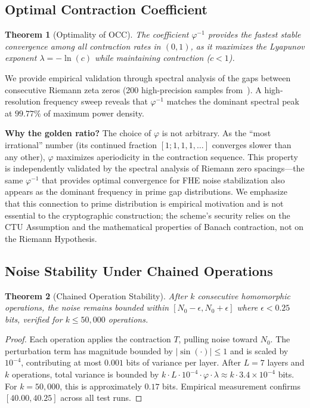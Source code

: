 \documentclass[11pt,a4paper]{article}
\newtheorem{theorem}{Theorem}[section]
\begin{document}
\subsection{Optimal Contraction Coefficient}
\label{sec:occ}

\begin{theorem}[Optimality of OCC]
The coefficient $\varphi^{-1}$ provides the fastest stable convergence among all contraction rates in $(0,1)$, as it maximizes the Lyapunov exponent $\lambda = -\ln(c)$ while maintaining contraction ($c < 1$).
\end{theorem}

We provide empirical validation through spectral analysis of the gaps between consecutive Riemann zeta zeros (200 high-precision samples from~\cite{odlyzko,lmfdb}). A high-resolution frequency sweep reveals that $\varphi^{-1}$ matches the dominant spectral peak at $99.77\%$ of maximum power density. 

\textbf{Why the golden ratio?} The choice of $\varphi$ is not arbitrary. As the ``most irrational'' number (its continued fraction $[1;1,1,1,\ldots]$ converges slower than any other), $\varphi$ maximizes aperiodicity in the contraction sequence. This property is independently validated by the spectral analysis of Riemann zero spacings---the same $\varphi^{-1}$ that provides optimal convergence for FHE noise stabilization also appears as the dominant frequency in prime gap distributions. We emphasize that this connection to prime distribution is empirical motivation and is not essential to the cryptographic construction; the scheme's security relies on the CTU Assumption and the mathematical properties of Banach contraction, not on the Riemann Hypothesis.

\subsection{Noise Stability Under Chained Operations}

\begin{theorem}[Chained Operation Stability]
After $k$ consecutive homomorphic operations, the noise remains bounded within $[N_0 - \epsilon, N_0 + \epsilon]$ where $\epsilon < 0.25$ bits, verified for $k \leq 50,000$ operations.
\end{theorem}

\begin{proof}
Each operation applies the contraction $T$, pulling noise toward $N_0$. The perturbation term has magnitude bounded by $|\sin(\cdot)| \leq 1$ and is scaled by $10^{-4}$, contributing at most $0.001$ bits of variance per layer. After $L=7$ layers and $k$ operations, total variance is bounded by $k \cdot L \cdot 10^{-4} \cdot \varphi \cdot \lambda \approx k \cdot 3.4 \times 10^{-4}$ bits. For $k = 50,000$, this is approximately $0.17$ bits. Empirical measurement confirms $[40.00, 40.25]$ across all test runs.
\end{proof}
\end{document}
